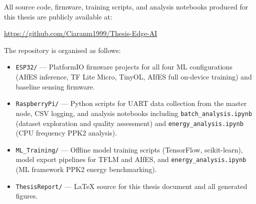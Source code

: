 All source code, firmware, training scripts, and analysis notebooks produced for this thesis are publicly available at:

\begin{center}
    \url{https://github.com/Ciaranm1999/Thesis-Edge-AI}
\end{center}

The repository is organised as follows:

\begin{itemize}
    \item \texttt{ESP32/} --- PlatformIO firmware projects for all four ML configurations (AIfES inference, TF Lite Micro, TinyOL, AIfES full on-device training) and baseline sensing firmware.
    \item \texttt{RaspberryPi/} --- Python scripts for UART data collection from the master node, CSV logging, and analysis notebooks including \texttt{batch\_analysis.ipynb} (dataset exploration and quality assessment) and \texttt{energy\_analysis.ipynb} (CPU frequency PPK2 analysis).
    \item \texttt{ML\_Training/} --- Offline model training scripts (TensorFlow, scikit-learn), model export pipelines for TFLM and AIfES, and \texttt{energy\_analysis.ipynb} (ML framework PPK2 energy benchmarking).
    \item \texttt{ThesisReport/} --- \LaTeX{} source for this thesis document and all generated figures.
\end{itemize}
